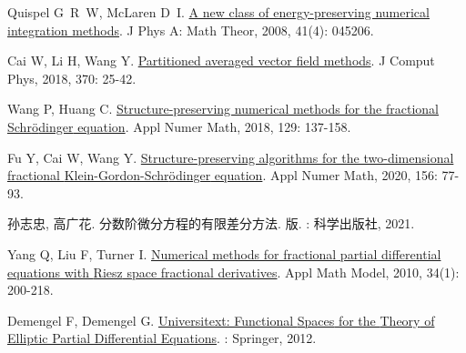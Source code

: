 \begin{thebibliography}{79}
    Quispel G~R~W, McLaren D~I.
    \newblock \href{https://iopscience.iop.org/article/10.1088/1751-8113/41/4/045206}{A new class of energy-preserving numerical integration methods}\allowbreak[J].
    \newblock J Phys A: Math Theor, 2008, 41\allowbreak (4): 045206.
    
    Cai W, Li H, Wang Y.
    \newblock \href{https://linkinghub.elsevier.com/retrieve/pii/S0021999118303012}{Partitioned averaged vector field methods}\allowbreak[J].
    \newblock J Comput Phys, 2018, 370: 25-42.
    
    Wang P, Huang C.
    \newblock \href{https://linkinghub.elsevier.com/retrieve/pii/S0168927418300709}{Structure-preserving numerical methods for the fractional {{Schr{\"o}dinger}} equation}\allowbreak[J].
    \newblock Appl Numer Math, 2018, 129: 137-158.
    
    Fu Y, Cai W, Wang Y.
    \newblock \href{https://www.sciencedirect.com/science/article/pii/S0168927420301264}{Structure-preserving algorithms for the two-dimensional fractional {{Klein-Gordon-Schr{\"o}dinger}} equation}\allowbreak[J].
    \newblock Appl Numer Math, 2020, 156: 77-93.
    
    {孙志忠}, {高广花}.
    \newblock 分数阶微分方程的有限差分方法\allowbreak[M].
     版.
    : {科学出版社}, 2021.
    
    Yang Q, Liu F, Turner I.
    \newblock \href{https://www.sciencedirect.com/science/article/pii/S0307904X09001127}{Numerical methods for fractional partial differential equations with {{Riesz}} space fractional derivatives}\allowbreak[J].
    \newblock Appl Math Model, 2010, 34\allowbreak (1): 200-218.
    
    Demengel F, Demengel G.
    \newblock \href{http://link.springer.com/10.1007/978-1-4471-2807-6}{Universitext: Functional {{Spaces}} for the {{Theory}} of {{Elliptic Partial Differential Equations}}}\allowbreak[M].
    : {Springer}, 2012.
    

\end{thebibliography}
